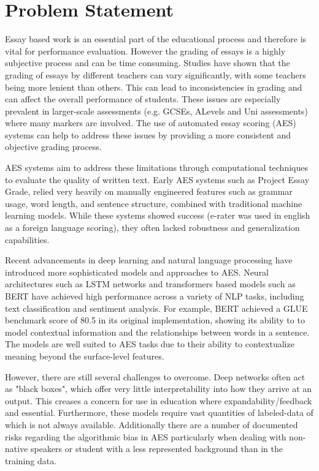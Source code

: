 \documentclass[11pt]{article}
\begin{document}
\section*{Problem Statement}
Essay based work is an essential part of the educational process and therefore is vital for performance evaluation. However
the grading of essays is a highly subjective process and can be time consuming. Studies have shown that the grading of essays
by different teachers can vary significantly, with some teachers being more lenient than others. This can lead to inconsistencies
in grading and can affect the overall performance of students. These issues are especially prevalent in larger-scale assessments 
(e.g. GCSEs, ALevels and Uni assessments) where many markers are involved. The use of automated essay scoring (AES) systems can help 
to address these issues by providing a more consistent and objective grading process.

AES systems aim to address these limitations through computational techniques to evaluate the quality of written text. Early AES systems 
such as Project Essay Grade, relied very heavily on manually engineered features such as grammar usage, word length, and sentence structure, combined with
traditional machine learning models. While these systems showed success (e-rater was used in english as a foreign language scoring), they often lacked
robustness and generalization capabilities.

Recent advancements in deep learning and natural language processing have introduced more sophisticated models and approaches to AES.
Neural architectures such as LSTM networks and transformers based models such as BERT have achieved high performance across a variety of NLP tasks, 
including text classification and sentiment analysis. For example, BERT achieved a GLUE benchmark score of 80.5 in its original implementation, showing its
ability to to model contextual information and the relationships between words in a sentence. The models are well suited to AES tasks due to their ability to 
contextualize meaning beyond the surface-level features.

However, there are still several challenges to overcome. Deep networks often act as "black boxes", which offer very little interpretability into how they arrive
at an output. This creases a concern for use in education where expandability/feedback and essential. Furthermore, these models require vast quantities of 
labeled-data of which is not always available. Additionally there are a number of documented risks regarding the algorithmic bias in AES particularly when
dealing with non-native speakers or student with a less represented background than in the training data.
\end{document}
